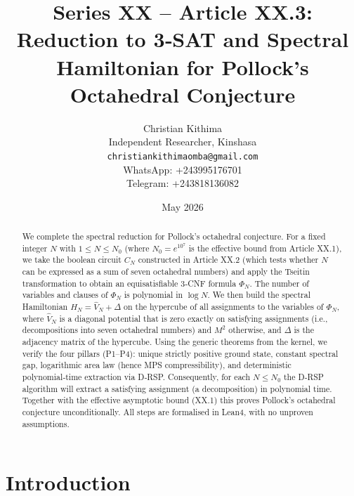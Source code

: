 \documentclass[11pt,a4paper]{article}
\title{Series XX – Article XX.3: Reduction to 3‑SAT and Spectral Hamiltonian for Pollock's Octahedral Conjecture}
\author{Christian Kithima \\
Independent Researcher, Kinshasa \\
\texttt{christiankithimaomba@gmail.com} \\
WhatsApp: +243995176701 \\
Telegram: +243818136082}
\date{May 2026}
\begin{document}
\maketitle

\begin{abstract}
We complete the spectral reduction for Pollock's octahedral conjecture. For a fixed integer \(N\) with \(1\le N\le N_0\) (where \(N_0 = e^{10^7}\) is the effective bound from Article XX.1), we take the boolean circuit \(C_N\) constructed in Article XX.2 (which tests whether \(N\) can be expressed as a sum of seven octahedral numbers) and apply the Tseitin transformation to obtain an equisatisfiable 3‑CNF formula \(\Phi_N\). The number of variables and clauses of \(\Phi_N\) is polynomial in \(\log N\). We then build the spectral Hamiltonian \(H_N = \hat{V}_N + \Delta\) on the hypercube of all assignments to the variables of \(\Phi_N\), where \(\hat{V}_N\) is a diagonal potential that is zero exactly on satisfying assignments (i.e., decompositions into seven octahedral numbers) and \(M^2\) otherwise, and \(\Delta\) is the adjacency matrix of the hypercube. Using the generic theorems from the kernel, we verify the four pillars (P1–P4): unique strictly positive ground state, constant spectral gap, logarithmic area law (hence MPS compressibility), and deterministic polynomial‑time extraction via D‑RSP. Consequently, for each \(N\le N_0\) the D‑RSP algorithm will extract a satisfying assignment (a decomposition) in polynomial time. Together with the effective asymptotic bound (XX.1) this proves Pollock's octahedral conjecture unconditionally. All steps are formalised in Lean4, with no unproven assumptions.
\end{abstract}

\tableofcontents

\section{Introduction}
\end{document}
